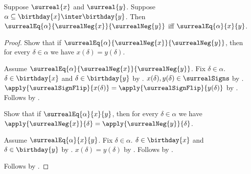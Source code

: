 \begin{proposition}\label{surreal_negation_eq_initial}
    Suppose $\surreal{x}$ and $\surreal{y}$.
    Suppose $\alpha\subseteq\birthday{x}\inter\birthday{y}$.
    Then $\surrealEq{\alpha}{\surrealNeg{x}}{\surrealNeg{y}}$ iff
        $\surrealEq{\alpha}{x}{y}$.
\end{proposition}
\begin{proof}
    Show that if $\surrealEq{\alpha}{\surrealNeg{x}}{\surrealNeg{y}}$, then
        for every $\delta\in\alpha$ we have $x(\delta)=y(\delta)$.
    \begin{subproof}
        Assume $\surrealEq{\alpha}{\surrealNeg{x}}{\surrealNeg{y}}$.
        Fix $\delta\in\alpha$.
        $\delta\in\birthday{x}$ and $\delta\in\birthday{y}$
            by .
        $x(\delta),y(\delta)\in\surrealSigns$
            by .
        $\apply{\surrealSignFlip}{x(\delta)}
            =\apply{\surrealSignFlip}{y(\delta)}$
            by .
        Follows by .
    \end{subproof}
    Show that if $\surrealEq{\alpha}{x}{y}$, then for every $\delta\in\alpha$
        we have
        $\apply{\surrealNeg{x}}{\delta}
            =\apply{\surrealNeg{y}}{\delta}$.
    \begin{subproof}
        Assume $\surrealEq{\alpha}{x}{y}$.
        Fix $\delta\in\alpha$.
        $\delta\in\birthday{x}$ and $\delta\in\birthday{y}$
            by .
        $x(\delta)=y(\delta)$ by .
        Follows by .
    \end{subproof}
    Follows by .
\end{proof}

